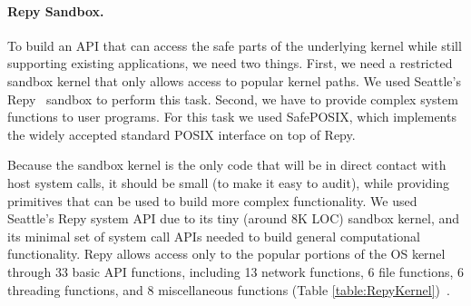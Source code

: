 \paragraph{Repy Sandbox.}

To build an API that can access the safe parts of the underlying kernel while
still supporting existing applications, we need two things. First, we need a
restricted sandbox kernel that only allows access to popular kernel paths. We
used Seattle's Repy~\cite{Repy-10} sandbox to perform this task. Second, we
have to provide complex system functions to user programs.
For this task we used SafePOSIX, which implements the widely accepted standard
POSIX interface on top of Repy.

Because the sandbox kernel is the only code that will be in direct contact with host
system calls, it should be small (to make it easy to audit), while providing
primitives that can be used to build more complex functionality.
We used Seattle's Repy system API due to its tiny (around 8K LOC) sandbox
kernel, and its minimal set of system call APIs needed to build general
computational functionality. Repy allows access only to the popular portions of
the OS kernel through 33 basic API functions, including 13 network functions, 6
file functions, 6 threading functions, and 8 miscellaneous functions (Table
\ref{table:RepyKernel})~\cite{Repy-10, RepyKernel}.

